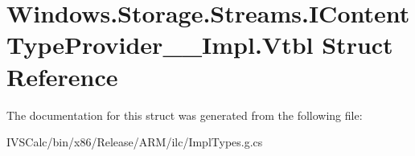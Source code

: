\hypertarget{struct_windows_1_1_storage_1_1_streams_1_1_i_content_type_provider_____impl_1_1_vtbl}{}\section{Windows.\+Storage.\+Streams.\+I\+Content\+Type\+Provider\+\_\+\+\_\+\+Impl.\+Vtbl Struct Reference}
\label{struct_windows_1_1_storage_1_1_streams_1_1_i_content_type_provider_____impl_1_1_vtbl}


The documentation for this struct was generated from the following file\+:\begin{DoxyCompactItemize}
\item 
I\+V\+S\+Calc/bin/x86/\+Release/\+A\+R\+M/ilc/Impl\+Types.\+g.\+cs\end{DoxyCompactItemize}
